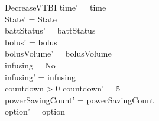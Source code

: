 \begin{schema}{DecreaseVTBI}
	time' = time\\ 
	State' = State\\
	battStatus' = battStatus\\
	bolus' = bolus\\
	bolusVolume' = bolusVolume\\
	infusing = No\\
	infusing' = infusing\\
	countdown > 0 \land countdown' = 5\\
	powerSavingCount' = powerSavingCount\\ option' = option\\
\end{schema}

